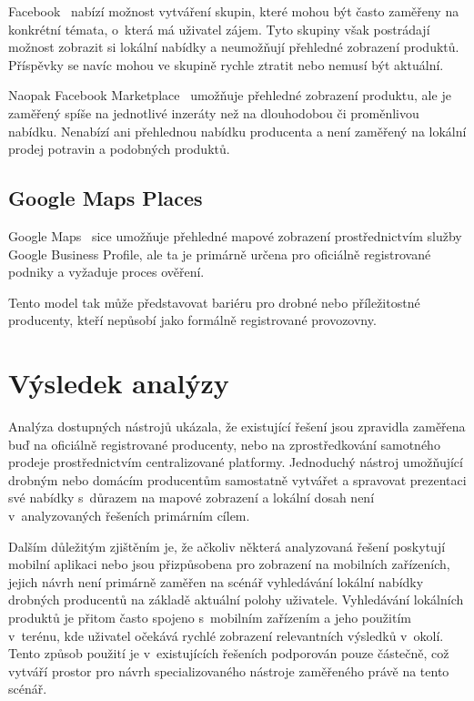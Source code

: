 Facebook~\parencite{facebook} nabízí možnost vytváření skupin, které mohou být často zaměřeny na konkrétní témata, o~která má uživatel zájem.
Tyto skupiny však postrádají možnost zobrazit si lokální nabídky a neumožňují přehledné zobrazení produktů.
Příspěvky se navíc mohou ve skupině rychle ztratit nebo nemusí být aktuální.

Naopak Facebook Marketplace~\parencite{facebook_marketplace} umožňuje přehledné zobrazení produktu, ale je zaměřený spíše na jednotlivé inzeráty než na dlouhodobou či proměnlivou nabídku.
Nenabízí ani přehlednou nabídku producenta a není zaměřený na lokální prodej potravin a podobných produktů.

\subsection{Google Maps Places}
Google Maps~\parencite{google_maps} sice umožňuje přehledné mapové zobrazení prostřednictvím služby Google Business Profile, ale ta je primárně určena pro oficiálně registrované podniky a vyžaduje proces ověření.

Tento model tak může představovat bariéru pro drobné nebo příležitostné producenty, kteří nepůsobí jako formálně registrované provozovny.


\section{Výsledek analýzy}
Analýza dostupných nástrojů ukázala, že existující řešení jsou zpravidla zaměřena buď na oficiálně registrované producenty, nebo na zprostředkování samotného prodeje prostřednictvím centralizované platformy.
Jednoduchý nástroj umožňující drobným nebo domácím producentům samostatně vytvářet a spravovat prezentaci své nabídky s~důrazem na mapové zobrazení a lokální dosah není v~analyzovaných řešeních primárním cílem.

Dalším důležitým zjištěním je, že ačkoliv některá analyzovaná řešení poskytují mobilní aplikaci nebo jsou přizpůsobena pro zobrazení na mobilních zařízeních, jejich návrh není primárně zaměřen na scénář vyhledávání lokální nabídky drobných producentů na základě aktuální polohy uživatele.
Vyhledávání lokálních produktů je přitom často spojeno s~mobilním zařízením a jeho použitím v~terénu, kde uživatel očekává rychlé zobrazení relevantních výsledků v~okolí.
Tento způsob použití je v~existujících řešeních podporován pouze částečně, což vytváří prostor pro návrh specializovaného nástroje zaměřeného právě na tento scénář.

